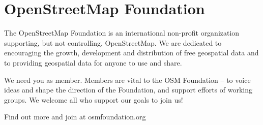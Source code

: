 \newpage
\section*{OpenStreetMap Foundation}
\label{osmf}
\pagestyle{osmf}
The OpenStreetMap Foundation is an
international non-profit organization
supporting, but not controlling,
OpenStreetMap. We are dedicated to
encouraging the growth, development and
distribution of free geospatial data and to
providing geospatial data for anyone to use
and share.

We need you as member. Members are vital
to the OSM Foundation -- to voice ideas
and shape the direction of the Foundation,
and support efforts of working groups. We
welcome all who support our goals to join us!

Find out more and join at osmfoundation.org
